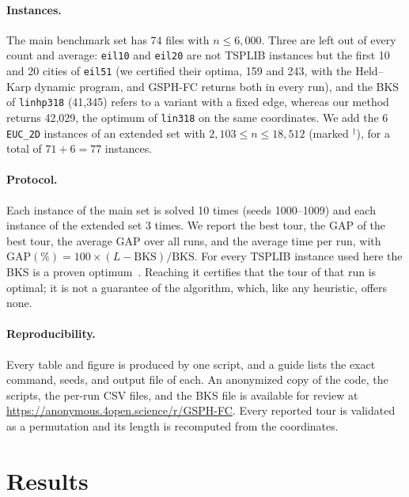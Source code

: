 \documentclass[runningheads]{llncs}
\begin{document}
\paragraph{Instances.} The main benchmark set has 74 files with
$n\le 6{,}000$. Three are left out of every count and average:
\texttt{eil10} and \texttt{eil20} are not TSPLIB instances but the first
10 and 20 cities of \texttt{eil51} (we certified their optima, 159 and
243, with the Held--Karp dynamic program, and GSPH-FC returns both in
every run), and the BKS of \texttt{linhp318} (41{,}345) refers to a
variant with a fixed edge, whereas our method returns 42{,}029, the
optimum of \texttt{lin318} on the same coordinates. We add the 6
\texttt{EUC\_2D} instances of an extended set with
$2{,}103\le n\le 18{,}512$ (marked $^{\dagger}$), for a total of
$71+6=77$ instances.

\paragraph{Protocol.} Each instance of the main set is solved 10 times
(seeds 1000--1009) and each instance of the extended set 3 times. We
report the best tour, the GAP of the best tour, the average GAP over all
runs, and the average time per run, with
GAP$(\%)=100\times(L-\text{BKS})/\text{BKS}$. For every TSPLIB instance
used here the BKS is a proven
optimum~\cite{reinelt1991tsplib,applegate2006tsp}. Reaching it
certifies that the tour of that run is optimal; it is not a guarantee
of the algorithm, which, like any heuristic, offers none.

\paragraph{Reproducibility.} Every table and figure is produced by one
script, and a guide lists the exact command, seeds, and output file of
each. An anonymized copy of the code, the scripts, the per-run CSV files,
and the BKS file is available for review at
\url{https://anonymous.4open.science/r/GSPH-FC}.
Every reported tour is validated as a permutation and its length is
recomputed from the coordinates.

\section{Results}
\label{sec:results}
\end{document}
